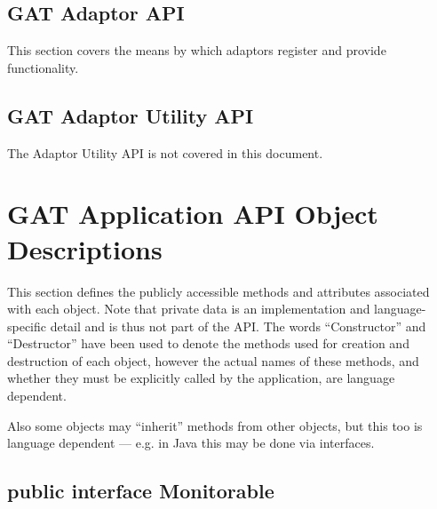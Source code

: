 \documentclass[$Date: 2003/06/26 19:29:31 $]{glabarticle}
\begin{document}
\subsection{GAT Adaptor API}

This section covers the means by which adaptors register and provide functionality.


\subsection{GAT Adaptor Utility API}

The Adaptor Utility API is not covered in this document.


\newpage

\section{GAT Application API Object Descriptions}
\label{sec:GAT-App-API}

This section defines the publicly accessible methods and attributes
associated with each object.  Note that private data is an
implementation and language-specific detail and is thus not part of
the API.  The words ``Constructor'' and ``Destructor'' have been used
to denote the methods used for creation and destruction of each
object, however the actual names of these methods, and whether they
must be explicitly called by the application, are language dependent.

Also some objects may ``inherit'' methods from other objects, but this too
is language dependent --- e.g. in Java this may be done via interfaces.


\newpage

\subsection{public interface Monitorable}
\end{document}
